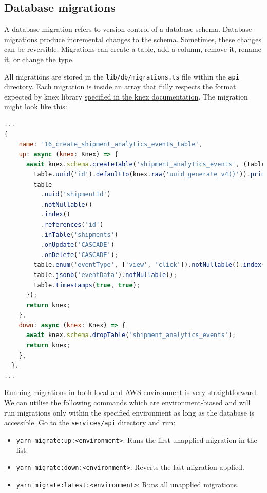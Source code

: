 \subsection{Database migrations}
A database migration refers to version control of a database schema.
Database migrations produce incremental changes to the schema.
Sometimes, these changes can be reversible. 
Migrations can create a table, add a column, remove it, rename it, or change the type.

All migrations are stored in the \texttt{lib/db/migrations.ts} file within the \texttt{api} directory.
Each migration is inside an array that fully respects the format expected by \gls{knex} library \href{https://knexjs.org/guide/migrations.html#custom-migration-sources}{specified in the \gls{knex} documentation}.
The migration might look like this:
\begin{lstlisting}[language=javascript,caption={Example of a migration from \texttt{migrations.ts}}]
...
{
    name: '16_create_shipment_analytics_events_table',
    up: async (knex: Knex) => {
      await knex.schema.createTable('shipment_analytics_events', (table) => {
        table.uuid('id').defaultTo(knex.raw('uuid_generate_v4()')).primary();
        table
          .uuid('shipmentId')
          .notNullable()
          .index()
          .references('id')
          .inTable('shipments')
          .onUpdate('CASCADE')
          .onDelete('CASCADE');
        table.enum('eventType', ['view', 'click']).notNullable().index().defaultTo('view');
        table.jsonb('eventData').notNullable();
        table.timestamps(true, true);
      });
      return knex;
    },
    down: async (knex: Knex) => {
      await knex.schema.dropTable('shipment_analytics_events');
      return knex;
    },
  },
...
\end{lstlisting}

Running migrations in both local and AWS environment is very straightforward.
We can utilise the following commands which are environment-biased and will run migrations only within the specified environment as long as the database is accessible.
Go to the \texttt{services/api} directory and run:
\begin{itemize}
    \item \texttt{yarn migrate:up:<environment>}: Runs the first unapplied migration in the list.
    \item \texttt{yarn migrate:down:<environment>}: Reverts the last migration applied.
    \item \texttt{yarn migrate:latest:<environment>}: Runs all unapplied migrations.
\end{itemize}

